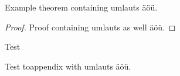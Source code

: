 \documentclass{scrartcl}
\begin{document}
\begin{satzrep}
Example theorem containing umlauts äöü.
\end{satzrep}

\begin{proof}
Proof containing umlauts as well äöü.
\end{proof}

Test

\begin{toappendix}
Test toappendix with umlauts äöü.
\end{toappendix}
\end{document}
